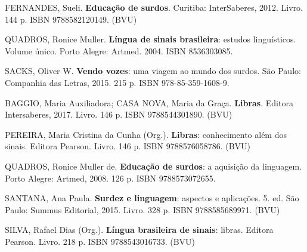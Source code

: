 \begin{pud}
	
	\begin{bibbasica}
		\item FERNANDES, Sueli. \textbf{Educação de surdos}. Curitiba: InterSaberes, 2012. Livro.  144 p. ISBN 9788582120149. (BVU)
		\item QUADROS, Ronice Muller. \textbf{Língua de sinais brasileira}: estudos linguísticos. Volume único. Porto Alegre: Artmed. 2004. ISBN  8536303085.		
		\item SACKS, Oliver W. \textbf{Vendo vozes}: uma viagem ao mundo dos surdos.   São Paulo: Companhia das Letras, 2015. 215 p. ISBN 978-85-359-1608-9.
	
	\end{bibbasica}
	
	\clearpage
	\begin{bibcomplementar}
    
		\item BAGGIO, Maria Auxiliadora; CASA NOVA, Maria da Graça. \textbf{Libras}. Editora Intersaberes, 2017. Livro. 146 p. ISBN 9788544301890. (BVU)
		\item PEREIRA, Maria Cristina da Cunha (Org.). \textbf{Libras}: conhecimento além dos sinais.  Editora Pearson. Livro.  146 p. ISBN 9788576058786. (BVU)
		\item QUADROS, Ronice Muller de. \textbf{Educação de surdos}: a aquisição da linguagem. Porto Alegre: Artmed, 2008. 126 p. ISBN 9788573072655.
		\item SANTANA, Ana Paula. \textbf{Surdez e linguagem}: aspectos e aplicações. 5. ed. São Paulo: Summus Editorial, 2015.  Livro. 328 p. ISBN 9788585689971. (BVU) 
		\item SILVA, Rafael Dias (Org.). \textbf{Língua brasileira de sinais}: libras.  Editora Pearson. Livro. 218 p. ISBN 9788543016733. (BVU)
		
	
	\end{bibcomplementar}		
	
		
\end{pud}